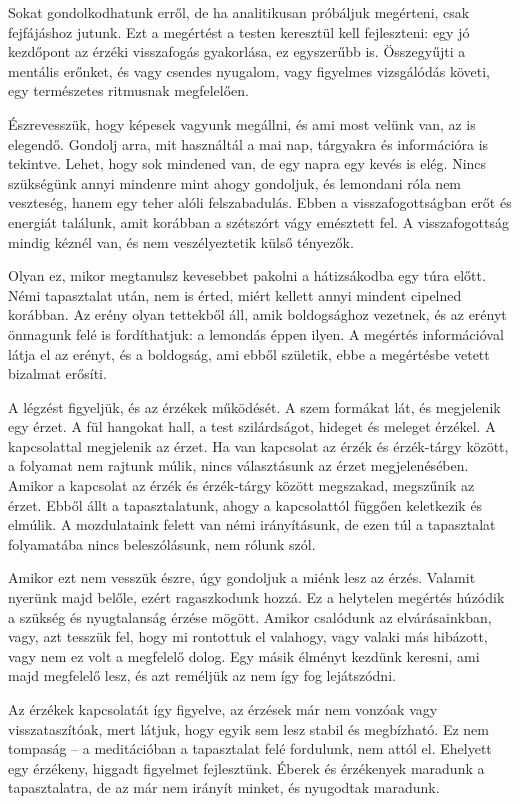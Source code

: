 Sokat gondolkodhatunk erről, de ha analitikusan próbáljuk megérteni,
csak fejfájáshoz jutunk. Ezt a megértést a testen keresztül kell
fejleszteni: egy jó kezdőpont az érzéki visszafogás gyakorlása, ez
egyszerűbb is. Összegyűjti a mentális erőnket, és vagy csendes nyugalom,
vagy figyelmes vizsgálódás követi, egy természetes ritmusnak
megfelelően.

Észrevesszük, hogy képesek vagyunk megállni, és ami most velünk van, az
is elegendő. Gondolj arra, mit használtál a mai nap, tárgyakra és
információra is tekintve. Lehet, hogy sok mindened van, de egy napra egy
kevés is elég. Nincs szükségünk annyi mindenre mint ahogy gondoljuk, és
lemondani róla nem veszteség, hanem egy teher alóli felszabadulás. Ebben
a visszafogottságban erőt és energiát találunk, amit korábban a
szétszórt vágy emésztett fel. A visszafogottság mindig kéznél van, és
nem veszélyeztetik külső tényezők.

Olyan ez, mikor megtanulsz kevesebbet pakolni a hátizsákodba egy túra
előtt. Némi tapasztalat után, nem is érted, miért kellett annyi mindent
cipelned korábban. Az erény olyan tettekből áll, amik boldogsághoz
vezetnek, és az erényt önmagunk felé is fordíthatjuk: a lemondás éppen
ilyen. A megértés információval látja el az erényt, és a boldogság, ami
ebből születik, ebbe a megértésbe vetett bizalmat erősíti.

A légzést figyeljük, és az érzékek működését. A szem formákat lát, és
megjelenik egy érzet. A fül hangokat hall, a test szilárdságot, hideget
és meleget érzékel. A kapcsolattal megjelenik az érzet. Ha van kapcsolat
az érzék és érzék-tárgy között, a folyamat nem rajtunk múlik, nincs
választásunk az érzet megjelenésében. Amikor a kapcsolat az érzék és
érzék-tárgy között megszakad, megszűnik az érzet. Ebből állt a
tapasztalatunk, ahogy a kapcsolattól függően keletkezik és elmúlik. A
mozdulataink felett van némi irányításunk, de ezen túl a tapasztalat
folyamatába nincs beleszólásunk, nem rólunk szól.

Amikor ezt nem vesszük észre, úgy gondoljuk a miénk lesz az érzés.
Valamit nyerünk majd belőle, ezért ragaszkodunk hozzá. Ez a helytelen
megértés húzódik a szükség és nyugtalanság érzése mögött. Amikor
csalódunk az elvárásainkban, vagy, azt tesszük fel, hogy mi rontottuk el
valahogy, vagy valaki más hibázott, vagy nem ez volt a megfelelő dolog.
Egy másik élményt kezdünk keresni, ami majd megfelelő lesz, és azt
reméljük az nem így fog lejátszódni.

Az érzékek kapcsolatát így figyelve, az érzések már nem vonzóak vagy
visszataszítóak, mert látjuk, hogy egyik sem lesz stabil és megbízható.
Ez nem tompaság -- a meditációban a tapasztalat felé fordulunk, nem
attól el. Ehelyett egy érzékeny, higgadt figyelmet fejlesztünk. Éberek
és érzékenyek maradunk a tapasztalatra, de az már nem irányít minket, és
nyugodtak maradunk.

